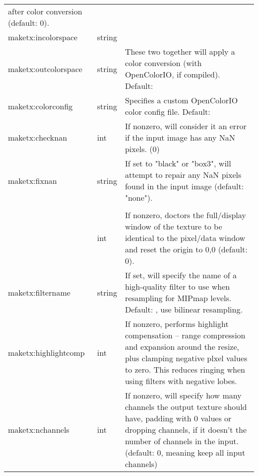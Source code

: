 \begin{longtable}{ >{\spc \cf\small}p{1.8in} >{\cf\small}l p{3in}}
                             after color conversion (default: 0). \\
   {\small maketx:incolorspace} & string & \\
   {\small maketx:outcolorspace} & string &
                          These two together will apply a color conversion
                              (with OpenColorIO, if compiled). Default: \qkw{} \\
   {\small maketx:colorconfig} & string &
                          Specifies a custom OpenColorIO color config file.
                              Default: \qkw{} \\
   maketx:checknan & int &   If nonzero, will consider it an error if the
                              input image has any NaN pixels. (0) \\
   maketx:fixnan & string & If set to "black" or "box3", will attempt
                              to repair any NaN pixels found in the
                              input image (default: "none"). \\
   \multicolumn{2}{l}{\spc \cf\small maketx:set_full_to_pixels} \\ & int &
                          If nonzero, doctors the full/display window
                              of the texture to be identical to the
                              pixel/data window and reset the origin
                              to 0,0 (default: 0). \\
   maketx:filtername & string &
                          If set, will specify the name of a high-quality
                             filter to use when resampling for MIPmap
                             levels. Default: \qkw{}, use bilinear resampling. \\
   maketx:highlightcomp & int &
                          If nonzero, performs highlight compensation --
                             range compression and expansion around 
                             the resize, plus clamping negative plxel
                             values to zero. This reduces ringing when
                             using filters with negative lobes. \\
   maketx:nchannels & int &  If nonzero, will specify how many channels
                             the output texture should have, padding with
                             0 values or dropping channels, if it doesn't
                             the number of channels in the input.
                             (default: 0, meaning keep all input channels) \\

\end{longtable}
